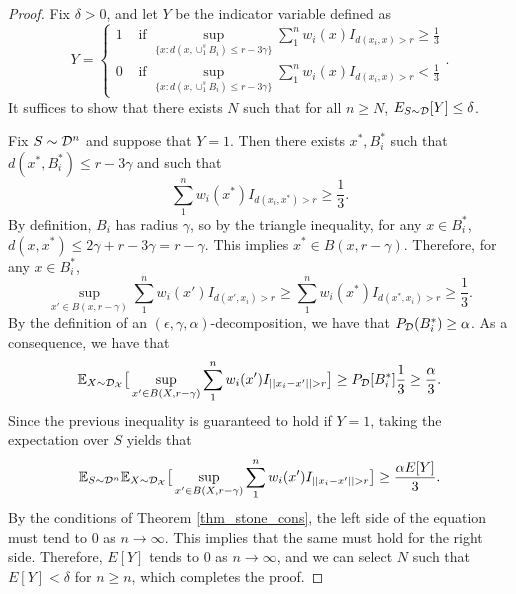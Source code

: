 \begin{proof} 
Fix $\delta > 0$, and let $Y$ be the indicator variable defined as $$Y = \begin{cases} 1 & \text{ if }\sup_{\{x: d(x, \cup_1^s B_i) \leq r - 3\gamma\}} \sum_1^n w_i(x)I_{d(x_i, x) > r} \geq \frac{1}{3} \\ 0 & \text{ if }\sup_{\{x: d(x, \cup_1^s B_i) \leq r - 3\gamma\}} \sum_1^n w_i(x)I_{d(x_i, x)> r} < \frac{1}{3} \end{cases}.$$ It suffices to show that there exists $N$ such that for all $n \geq N$, $E_{S \sim {\mathcal D}}[Y] \leq \delta$. 

Fix $S \sim {\mathcal D}^n$ and suppose that $Y = 1$. Then there exists $x^*, B_i^*$ such that $d(x^*, B_i^*) \leq r - 3\gamma$ and such that $$\sum_1^n w_i(x^*)I_{d(x_i, x^*) > r} \geq \frac{1}{3}.$$ By definition, $B_i$ has radius $\gamma$, so by the triangle inequality, for any $x \in B_i^*$, $d(x, x^*) \leq 2\gamma + r - 3\gamma = r - \gamma$. This implies $x^* \in B(x, r-\gamma)$. Therefore, for any $x \in B_i^*$, $$\sup_{x' \in B(x, r-\gamma)} \sum_1^n w_i(x')I_{d(x', x_i) > r} \geq \sum_1^n w_i(x^*)I_{d(x^*, x_i) > r} \geq \frac{1}{3}.$$ By the definition of an $(\epsilon, \gamma, \alpha)$-decomposition, we have that $P_{\mathcal D}(B_i^*) \geq \alpha$. As a consequence, we have that $$\mathbb{E}_{X \sim {\mathcal D}_\mathcal X} \big [ \sup_{x' \in B(X, r-\gamma)} \sum_1^n w_i(x')I_{||x_i - x'|| > r} \big] \geq P_{\mathcal D}[B_i^*]\frac{1}{3} \geq \frac{\alpha}{3}.$$ Since the previous inequality is guaranteed to hold if $Y = 1$, taking the expectation over $S$ yields that $$\mathbb{E}_{S \sim {\mathcal D}^n} \mathbb{E}_{X \sim {\mathcal D}_\mathcal X} \big [ \sup_{x' \in B(X, r-\gamma)} \sum_1^n w_i(x')I_{||x_i - x'|| > r} \big] \geq \frac{\alpha E[Y]}{3}.$$ By the conditions of Theorem \ref{thm_stone_cons}, the left side of the equation must tend to $0$ as $n \to \infty$. This implies that the same must hold for the right side. Therefore, $E[Y]$ tends to $0$ as $n \to \infty$, and we can select $N$ such that $E[Y] < \delta$ for $n \geq n$, which completes the proof. 
\end{proof}

